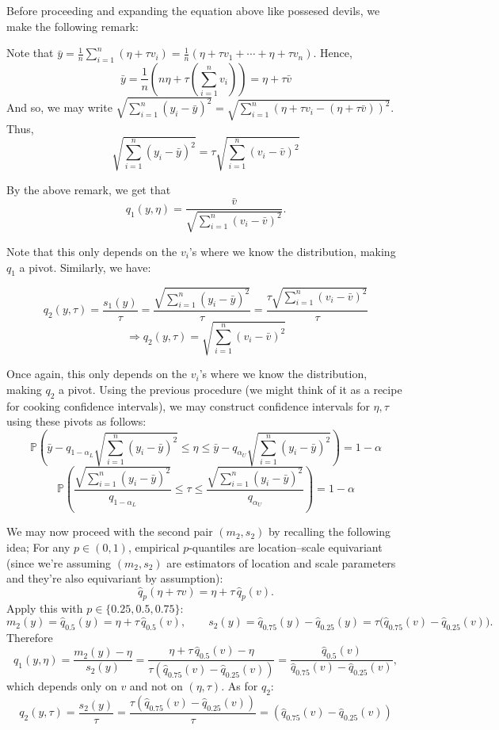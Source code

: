 Before proceeding and expanding the equation above like possesed devils, we make the following remark:

\begin{remark}
    Note that $\bar{y} = \frac{1}{n} \sum_{i=1}^{n} (\eta + \tau v_i) = \frac{1}{n} (\eta + \tau v_1 + \cdots + \eta + \tau v_n)$. Hence,
    $$\bar{y} = \frac{1}{n}(n \eta + \tau(\sum_{i=1}^{n} v_i)) = \eta + \tau \bar{v}$$
    And so, we may write $\sqrt{\sum_{i=1}^{n} (y_i - \bar{y})^2} = \sqrt{\sum_{i=1}^{n} (\eta + \tau v_i - (\eta + \tau \bar{v}))^2}$. Thus,
    $$\sqrt{\sum_{i=1}^{n} (y_i - \bar{y})^2} = \tau \sqrt{\sum_{i=1}^{n} (v_i - \bar{v})^2}$$
\end{remark}

By the above remark, we get that 
$$q_1(y, \eta) = \frac{\bar{v}}{\sqrt{\sum_{i=1}^{n} (v_i - \bar{v})^2}}.$$

Note that this only depends on the $v_i$'s where we know the distribution, making $q_1$ a pivot. Similarly, we have:

$$q_2(y, \tau) = \frac{s_1(y)}{\tau} = \frac{\sqrt{\sum_{i=1}^{n} (y_i - \bar{y})^2}}{\tau} = \frac{\tau \sqrt{\sum_{i=1}^{n} (v_i - \bar{v})^2}}{\tau}$$
$$\Rightarrow q_2(y, \tau) = \sqrt{\sum_{i=1}^{n} (v_i - \bar{v})^2}$$

Once again, this only depends on the $v_i$'s where we know the distribution, making $q_2$ a pivot. Using the previous procedure (we might think of it as a recipe for cooking confidence intervals),
we may construct confidence intervals for $\eta, \tau$ using these pivots as follows:
$$\mathbb{P}\left(\bar{y} - q_{1-\alpha_L} \sqrt{\sum_{i=1}^{n} (y_i - \bar{y})^2} \leq \eta \leq \bar{y} - q_{\alpha_U} \sqrt{\sum_{i=1}^{n} (y_i - \bar{y})^2}\right) = 1 - \alpha$$
$$\mathbb{P}\left(\frac{\sqrt{\sum_{i=1}^{n} (y_i - \bar{y})^2}}{q_{1-\alpha_L}} \leq \tau \leq \frac{\sqrt{\sum_{i=1}^{n} (y_i - \bar{y})^2}}{q_{\alpha_U}}\right) = 1 - \alpha$$

\vspace{0.2cm}

We may now proceed with the second pair $(m_2, s_2)$ by recalling the following idea;
For any $p\in(0,1)$, empirical $p$-quantiles are location--scale equivariant (since we're assuming $(m_2, s_2)$ are estimators of location and scale parameters and they're also equivariant by assumption):
\[
\widehat q_p(\eta+\tau v)=\eta+\tau\,\widehat q_p(v).
\]
Apply this with $p\in\{0.25,0.5,0.75\}$:
\[
m_2(y)=\widehat q_{0.5}(y)=\eta+\tau\,\widehat q_{0.5}(v),\qquad
s_2(y)=\widehat q_{0.75}(y)-\widehat q_{0.25}(y)
=\tau\big(\widehat q_{0.75}(v)-\widehat q_{0.25}(v)\big).
\]
Therefore
\[
q_1(y, \eta) = \frac{m_2(y)-\eta}{s_2(y)}
=\frac{\eta+\tau\,\widehat q_{0.5}(v)-\eta}{\tau(\widehat q_{0.75}(v)-\widehat q_{0.25}(v))}
=\frac{\widehat q_{0.5}(v)}{\widehat q_{0.75}(v)-\widehat q_{0.25}(v)},
\]
which depends only on $v$ and not on $(\eta,\tau)$. As for $q_2$:
$$q_2(y, \tau) = \frac{s_2(y)}{\tau} = \frac{\tau(\widehat q_{0.75}(v)-\widehat q_{0.25}(v))}{\tau} = (\widehat q_{0.75}(v)-\widehat q_{0.25}(v))$$

